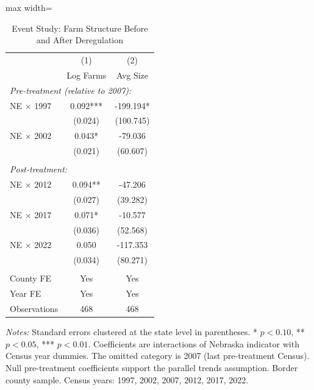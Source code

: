 \begin{table}[H]
\centering
\caption{Event Study: Farm Structure Before and After Deregulation}
\label{tab:event_study}
\begin{threeparttable}
\begin{adjustbox}{max width=\textwidth}
\begin{tabular}{lcc}
\toprule
 & (1) & (2) \\
 & Log Farms & Avg Size \\
\midrule
\multicolumn{3}{l}{\textit{Pre-treatment (relative to 2007):}} \\
NE $\times$ 1997 & 0.092*** & -199.194* \\
 & (0.024) & (100.745) \\
NE $\times$ 2002 & 0.043* & -79.036 \\
 & (0.021) & (60.607) \\
\\
\multicolumn{3}{l}{\textit{Post-treatment:}} \\
NE $\times$ 2012 & 0.094** & -47.206 \\
 & (0.027) & (39.282) \\
NE $\times$ 2017 & 0.071* & -10.577 \\
 & (0.036) & (52.568) \\
NE $\times$ 2022 & 0.050 & -117.353 \\
 & (0.034) & (80.271) \\
\\
County FE & Yes & Yes \\
Year FE & Yes & Yes \\
Observations & 468 & 468 \\
\bottomrule
\end{tabular}
\end{adjustbox}
\begin{tablenotes}[flushleft]
\small
\item \textit{Notes:} Standard errors clustered at the state level in parentheses. * $p<0.10$, ** $p<0.05$, *** $p<0.01$. Coefficients are interactions of Nebraska indicator with Census year dummies. The omitted category is 2007 (last pre-treatment Census). Null pre-treatment coefficients support the parallel trends assumption. Border county sample. Census years: 1997, 2002, 2007, 2012, 2017, 2022.
\end{tablenotes}
\end{threeparttable}
\end{table}
